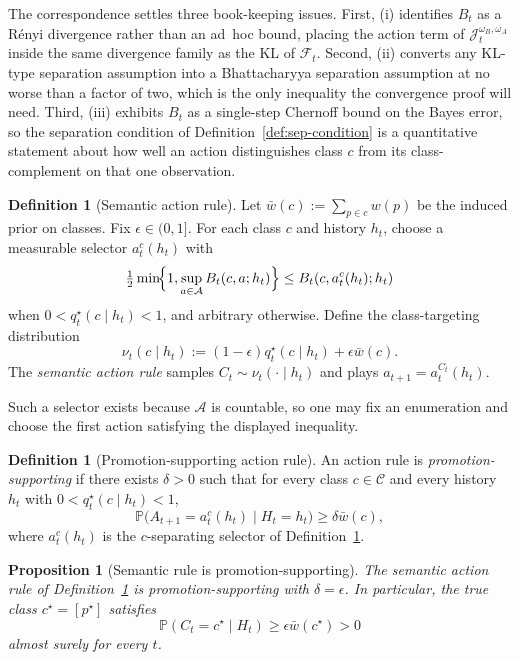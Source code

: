 \documentclass[11pt]{article}
\newtheorem{proposition}[theorem]{Proposition}
\theoremstyle{definition}
\newtheorem{definition}[theorem]{Definition}
\theoremstyle{remark}
\newcommand{\Acal}{\mathcal{A}}
\newcommand{\Ccal}{\mathcal{C}}
\newcommand{\Prob}{\mathbb{P}}
\begin{document}
The correspondence settles three book-keeping issues. First, (i) identifies $B_t$ as a R\'enyi divergence rather than an ad~hoc bound, placing the action term of $\mathcal J_t^{\omega_B,\omega_A}$ inside the same divergence family as the KL of $\mathcal F_t$. Second, (ii) converts any KL-type separation assumption into a Bhattacharyya separation assumption at no worse than a factor of two, which is the only inequality the convergence proof will need. Third, (iii) exhibits $B_t$ as a single-step Chernoff bound on the Bayes error, so the separation condition of Definition~\ref{def:sep-condition} is a quantitative statement about how well an action distinguishes class $c$ from its class-complement on that one observation.

\begin{definition}[Semantic action rule]
\label{def:semantic-rule}
Let $\bar w(c):=\sum_{p\in c}w(p)$ be the induced prior on classes. Fix $\epsilon\in(0,1]$. For each class $c$ and history $h_t$, choose a measurable selector $a_t^c(h_t)$ with
\[
\tfrac{1}{2}\min\!\Bigl\{1,\sup_{a\in\Acal}B_t(c,a;h_t)\Bigr\}
\le
B_t(c,a_t^c(h_t);h_t)
\]
when $0<q_t^\star(c\mid h_t)<1$, and arbitrary otherwise. Define the class-targeting distribution
\[
\nu_t(c\mid h_t):=(1-\epsilon)q_t^\star(c\mid h_t)+\epsilon\bar w(c).
\]
The \emph{semantic action rule} samples $C_t\sim\nu_t(\cdot\mid h_t)$ and plays $a_{t+1}=a_t^{C_t}(h_t)$.
\end{definition}

Such a selector exists because $\Acal$ is countable, so one may fix an enumeration and choose the first action satisfying the displayed inequality.

\begin{definition}[Promotion-supporting action rule]
\label{def:promotion-supporting}
An action rule is \emph{promotion-supporting} if there exists $\delta>0$ such that for every class $c\in\Ccal$ and every history $h_t$ with $0<q_t^\star(c\mid h_t)<1$,
\[
\Prob\bigl(A_{t+1}=a_t^c(h_t)\mid H_t=h_t\bigr)\ge \delta\bar w(c),
\]
where $a_t^c(h_t)$ is the $c$-separating selector of Definition~\ref{def:semantic-rule}.
\end{definition}

\begin{proposition}[Semantic rule is promotion-supporting]
\label{prop:semantic-is-promotion-supporting}
The semantic action rule of Definition~\ref{def:semantic-rule} is promotion-supporting with $\delta=\epsilon$. In particular, the true class $c^\star=[p^\star]$ satisfies
\[
\Prob(C_t=c^\star\mid H_t)\ge\epsilon\bar w(c^\star)>0
\]
almost surely for every $t$.
\end{proposition}
\end{document}

